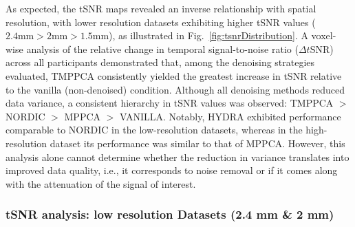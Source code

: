 As expected, the tSNR maps revealed an inverse relationship with spatial resolution, with lower resolution datasets exhibiting higher tSNR values ($2.4\text{mm} > 2\text{mm} > 1.5\text{mm}$), as illustrated in Fig.~\ref{fig:tsnrDistribution}. A voxel-wise analysis of the relative change in temporal signal-to-noise ratio ($\Delta t\text{SNR}$) across all participants demonstrated that, among the denoising strategies evaluated, TMPPCA consistently yielded the greatest increase in tSNR relative to the vanilla (non-denoised) condition. Although all denoising methods reduced data variance, a consistent hierarchy in tSNR values was observed: TMPPCA $>$ NORDIC $>$ MPPCA $>$ VANILLA. Notably, HYDRA exhibited performance comparable to NORDIC in the low-resolution datasets, whereas in the high-resolution dataset its performance was similar to that of MPPCA. However, this analysis alone cannot determine whether the reduction in variance translates into improved data quality, i.e., it corresponds to noise removal or if it comes along with the attenuation of the signal of interest.

\subsubsection{tSNR analysis: low resolution Datasets (2.4 mm \&  2 mm)}


